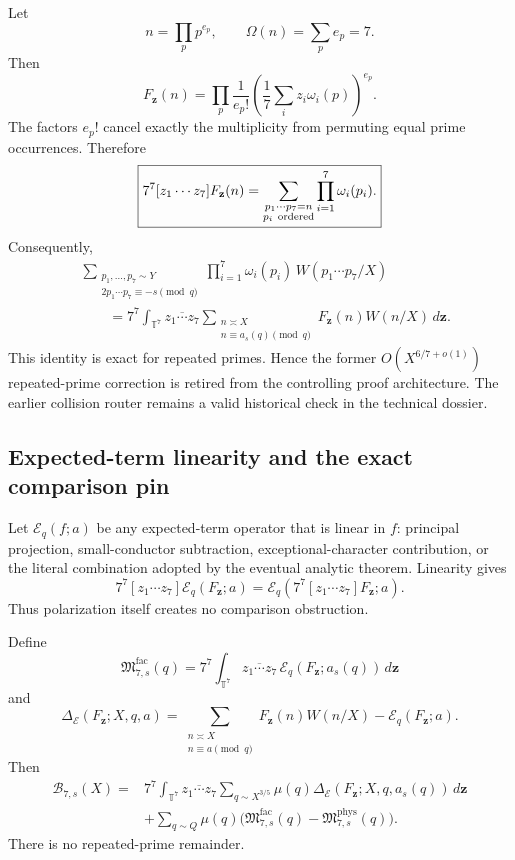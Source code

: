 \documentclass[11pt]{article}
\theoremstyle{definition}
\newcommand{\1}{\mathbf 1}
\newcommand{\B}{\mathcal B}
\begin{document}
Let
\[
n=\prod_pp^{e_p},\qquad\Omega(n)=\sum_pe_p=7.
\]
Then
\[
F_{\mathbf z}(n)=
\prod_p\frac1{e_p!}
\left(\frac17\sum_i z_i\omega_i(p)\right)^{e_p}.
\]
The factors $e_p!$ cancel exactly the multiplicity from permuting equal prime occurrences.
Therefore
\[
\boxed{
7^7[z_1\cdots z_7]F_{\mathbf z}(n)
=
\sum_{\substack{p_1\cdots p_7=n\\p_i\ {\rm ordered}}}
\prod_{i=1}^7\omega_i(p_i).
}
\]
Consequently,
\[
\boxed{
\begin{aligned}
&\sum_{\substack{p_1,\ldots,p_7\sim Y\\
2p_1\cdots p_7\equiv-s\pmod q}}
\prod_{i=1}^7\omega_i(p_i)\,W(p_1\cdots p_7/X)
\\
&\qquad =
7^7\int_{\mathbb T^7}\overline{z_1\cdots z_7}
\sum_{\substack{n\asymp X\\n\equiv a_s(q)\pmod q}}
F_{\mathbf z}(n)W(n/X)\,d\mathbf z .
\end{aligned}}
\]
This identity is exact for repeated primes.  Hence the former
$O(X^{6/7+o(1)})$ repeated-prime correction is retired from the controlling proof
architecture.  The earlier collision router remains a valid historical check in the
technical dossier.

\subsection{Expected-term linearity and the exact comparison pin}

Let $\mathcal E_q(f;a)$ be any expected-term operator that is linear in $f$:
principal projection, small-conductor subtraction, exceptional-character contribution, or
the literal combination adopted by the eventual analytic theorem.  Linearity gives
\[
\boxed{
7^7[z_1\cdots z_7]\mathcal E_q(F_{\mathbf z};a)
=
\mathcal E_q\!\left(7^7[z_1\cdots z_7]F_{\mathbf z};a\right).
}
\]
Thus polarization itself creates no comparison obstruction.

Define
\[
\mathfrak M^{\mathrm{fac}}_{7,s}(q)
=
7^7\int_{\mathbb T^7}\overline{z_1\cdots z_7}\,
\mathcal E_q(F_{\mathbf z};a_s(q))\,d\mathbf z
\]
and
\[
\Delta_{\mathcal E}(F_{\mathbf z};X,q,a)
=
\sum_{\substack{n\asymp X\\n\equiv a\pmod q}}
F_{\mathbf z}(n)W(n/X)-\mathcal E_q(F_{\mathbf z};a).
\]
Then
\[
\boxed{
\begin{aligned}
\B_{7,s}(X)
={}&7^7\int_{\mathbb T^7}\overline{z_1\cdots z_7}
\sum_{q\sim X^{3/5}}\mu(q)
\Delta_{\mathcal E}(F_{\mathbf z};X,q,a_s(q))\,d\mathbf z\\
&+\sum_{q\sim Q}\mu(q)
\bigl(\mathfrak M^{\mathrm{fac}}_{7,s}(q)
-\mathfrak M^{\mathrm{phys}}_{7,s}(q)\bigr).
\end{aligned}}
\]
There is no repeated-prime remainder.
\end{document}
